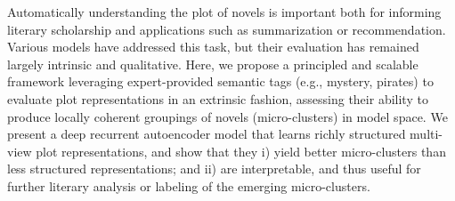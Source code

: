 Automatically understanding the plot of novels is important both for informing literary scholarship and applications such as summarization or recommendation. Various models have addressed this task, but their evaluation has remained largely intrinsic and qualitative. Here, we propose a principled and scalable framework leveraging expert-provided semantic tags (e.g., mystery, pirates) to evaluate plot representations in an extrinsic fashion, assessing their ability to produce locally coherent groupings of novels (micro-clusters) in model space. We present a deep recurrent autoencoder model that learns richly structured multi-view plot representations, and show that they i) yield better micro-clusters than less structured representations; and ii) are interpretable, and thus useful for further literary analysis or labeling of the emerging micro-clusters.
